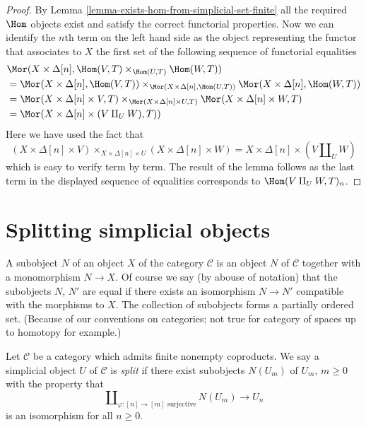 \begin{proof}
By Lemma \ref{lemma-exists-hom-from-simplicial-set-finite}
all the required $\Hom$ objects exist and satisfy the
correct functorial properties. Now we can identify
the $n$th term on the left hand side as the object
representing the functor that associates to $X$
the first set of the following sequence of functorial
equalities
\begin{align*}
&
\Mor(X \times \Delta[n],
\Hom(V, T) \times_{\Hom(U, T)} \Hom(W, T)) \\
& =
\Mor(X \times \Delta[n], \Hom(V, T))
\times_{\Mor(X \times \Delta[n], \Hom(U, T))}
\Mor(X \times \Delta[n], \Hom(W, T)) \\
& =
\Mor(X \times \Delta[n] \times V, T)
\times_{\Mor(X \times \Delta[n] \times U, T)}
\Mor(X \times \Delta[n] \times W, T) \\
& =
\Mor(X \times \Delta[n] \times (V \amalg_U W), T))
\end{align*}
Here we have used the fact that
$$
(X \times \Delta[n] \times V)
\times_{X \times \Delta[n] \times U}
(X \times \Delta[n] \times W)
=
X \times \Delta[n] \times (V \amalg_U W)
$$
which is easy to verify term by term. The result of the lemma
follows as the last term in the displayed sequence of
equalities corresponds to $\Hom(V \amalg_U W, T)_n$.
\end{proof}













\section{Splitting simplicial objects}
\label{section-splitting}

\noindent
A subobject $N$ of an object $X$ of the category $\mathcal{C}$
is an object $N$ of $\mathcal{C}$ together with a monomorphism
$N \to X$. Of course we say (by abouse of notation) that
the subobjects $N$, $N'$ are equal if there exists an isomorphism
$N \to N'$ compatible with the morphisms to $X$. The collection
of subobjects forms a partially ordered set. (Because of our
conventions on categories; not true for category of spaces
up to homotopy for example.)

\begin{definition}
\label{definition-split}
Let $\mathcal{C}$ be a category which admits finite nonempty coproducts.
We say a simplicial object $U$ of $\mathcal{C}$ is {\it split}
if there exist subobjects $N(U_m)$ of $U_m$, $m \geq 0$
with the property that
\begin{equation}
\label{equation-splitting}
\coprod\nolimits_{\varphi : [n] \to [m]\text{ surjective}}
N(U_m)
\longrightarrow
U_n
\end{equation}
is an isomorphism for all $n \geq 0$.
\end{definition}

